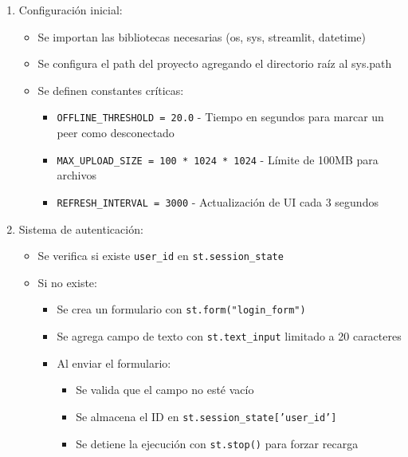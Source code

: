 \documentclass[12pt]{article}
\begin{document}
\begin{enumerate}
    \item Configuración inicial:
    \begin{itemize}
        \item Se importan las bibliotecas necesarias (os, sys, streamlit, datetime)
        \item Se configura el path del proyecto agregando el directorio raíz al sys.path
        \item Se definen constantes críticas:
        \begin{itemize}
            \item \texttt{OFFLINE\_THRESHOLD = 20.0} - Tiempo en segundos para marcar un peer como desconectado
            \item \texttt{MAX\_UPLOAD\_SIZE = 100 * 1024 * 1024} - Límite de 100MB para archivos
            \item \texttt{REFRESH\_INTERVAL = 3000} - Actualización de UI cada 3 segundos
        \end{itemize}
    \end{itemize}

    \item Sistema de autenticación:
    \begin{itemize}
        \item Se verifica si existe \texttt{user\_id} en \texttt{st.session\_state}
        \item Si no existe:
        \begin{itemize}
            \item Se crea un formulario con \texttt{st.form("login\_form")}
            \item Se agrega campo de texto con \texttt{st.text\_input} limitado a 20 caracteres
            \item Al enviar el formulario:
            \begin{itemize}
                \item Se valida que el campo no esté vacío
                \item Se almacena el ID en \texttt{st.session\_state['user\_id']}
                \item Se detiene la ejecución con \texttt{st.stop()} para forzar recarga
            \end{itemize}
        \end{itemize}
    \end{itemize}


\end{enumerate}
\end{document}
